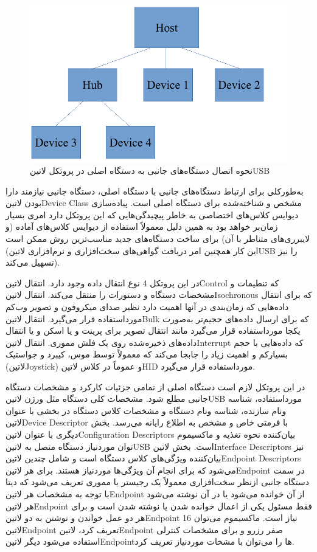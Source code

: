 \begin{figure}[!h]
	\centering
	\includegraphics[width=.7\linewidth]{Assets/USB.pdf}
	\caption{نحوه اتصال دستگاه‌های جانبی به دستگاه اصلی در پروتکل ‌لاتین{USB}}
	\label{fig:USBConnection}
\end{figure}

به‌طورکلی برای ارتباط دستگاه‌های جانبی با دستگاه اصلی، دستگاه جانبی نیازمند دارا بودن ‌لاتین{Device Class} مشخص و شناخته‌شده برای دستگاه اصلی است. پیاده‌سازی دیوایس کلاس‌های اختصاصی به خاطر پیچیدگی‌هایی که این پروتکل دارد امری بسیار زمان‌بر خواهد بود به همین دلیل معمولاً استفاده از دیوایس کلاس‌های آماده (و لایبرری‌های متناطر با آن) برای ساخت دستگاه‌های جدید مناسب‌ترین روش ممکن است (این کار همچنین امر دریافت گواهی‌های سخت‌افزاری و نرم‌افزاری ‌لاتین{USB} را نیز تسهیل می‌کند).

در این پروتکل 4 نوع انتقال داده وجود دارد. انتقال ‌لاتین{Control} که تنطیمات و مشخصات دستگاه و دستورات را منتقل می‌کند. انتقال ‌لاتین{Isochronous} که برای انتقال داده‌هایی که زمان‌بندی در آنها اهمیت دارد نظیر صدای میکروفون و تصویر وب‌کم مورداستفاده قرار می‌گیرد. انتقال ‌لاتین{Bulk} که برای ارسال داده‌های حجیم‌تر به‌صورت یکجا مورداستفاده قرار می‌گیرد مانند انتقال تصویر برای پرینت و یا اسکن و یا انتقال داده‌های ذخیره‌شده روی یک فلش مموری. انتقال ‌لاتین{Interrupt} که داده‌هایی با حجم بسیارکم و اهمیت زیاد را جابجا می‌کند که معمولاً توسط موس، کیبرد و جواستیک (‌لاتین{Joystick}) و عموماً در کلاس ‌لاتین{HID} مورداستفاده قرار می‌گیرد.

در این پروتکل لازم است دستگاه اصلی از تمامی جزئیات کارکرد و مشخصات دستگاه جانبی مطلع شود. مشخصات کلی دستگاه مثل ورژن ‌لاتین{USB} مورداستفاده، شناسه ونام سازنده، شناسه ونام دستگاه و مشخصات کلاس دستگاه در بخشی با عنوان ‌لاتین{Device Descriptor} با فرمتی خاص و مشخص به اطلاع رایانه می‌رسد. بخش دیگری با عنوان ‌لاتین{Configuration Descriptors} بیان‌کننده نحوه تغذیه و ماکسیموم توان موردنیاز دستگاه متصل به ‌لاتین{USB} است. بخش ‌لاتین{Interface Descriptors} نیز بیان‌کننده ویژگی‌های کلاس دستگاه است و شامل چندین ‌لاتین{Endpoint Descriptors} می‌شود که برای انجام آن ویژگی‌ها موردنیاز هستند. برای هر ‌لاتین{Endpoint} در سمت دستگاه جانبی ازنظر سخت‌افزاری معمولاً یک رجیستر یا مموری تعریف می‌شود که دیتا با توجه به مشخصات هر ‌لاتین{Endpoint} از آن خوانده می‌شود یا در آن نوشته می‌شود هر ‌لاتین{Endpoint} فقط مسئول یکی از اعمال خوانده شدن یا نوشته شدن است و برای هر دو عمل خواندن و نوشتن به دو ‌لاتین{Endpoint} نیاز است. ماکسیموم می‌توان 16 ‌لاتین{Endpoint} تعریف کرد، ‌لاتین{Endpoint} صفر رزرو و برای مشخصات کنترلی استفاده می‌شود دیگر ‌لاتین{Endpoint}‌ها را می‌توان با مشخات موردنیاز تعریف کرد. 


